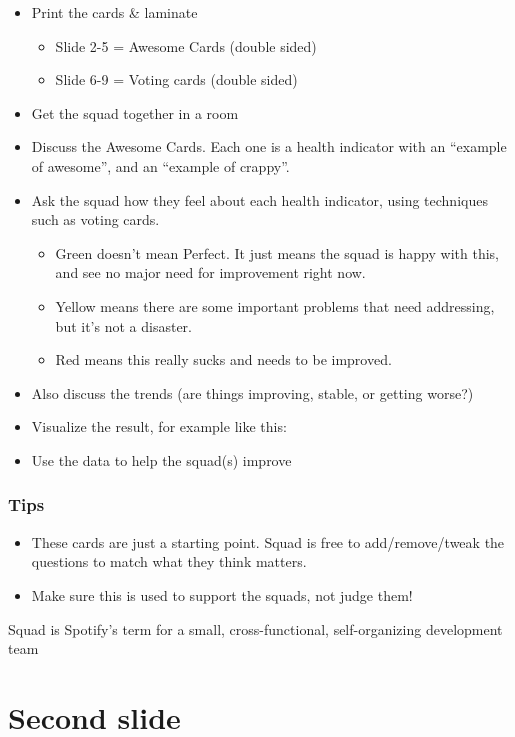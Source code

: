 \documentclass[a4paper]{article}
\begin{document}
\begin{itemize}
\item Print the cards \& laminate


\begin{itemize}
\item Slide 2-5 = Awesome Cards (double sided)
\item Slide 6-9 = Voting cards (double sided)
\end{itemize}
\item Get the squad together in a room
\item Discuss the Awesome Cards. Each one is a health indicator with an “example of awesome”, and an “example of crappy”.
\item Ask the squad how they feel about each health indicator, using techniques such as voting cards.


\begin{itemize}
\item Green doesn’t mean Perfect. It just means the squad is happy with this, and see no major need for improvement right now.
\item Yellow means there are some important problems that need addressing, but it’s not a disaster.
\item Red means this really sucks and needs to be improved.
\end{itemize}
\item Also discuss the trends (are things improving, stable, or getting worse?)
\item Visualize the result, for example like this:
\item Use the data to help the squad(s) improve
\end{itemize}

\subsubsection{Tips}

\begin{itemize}
\item These cards are just a starting point. Squad is free to add/remove/tweak the questions to match what they think matters.
\item Make sure this is used to support the squads, not judge them!
\end{itemize}

Squad is Spotify’s term for a small, cross-functional, self-organizing development team

\section{Second slide}
\end{document}

